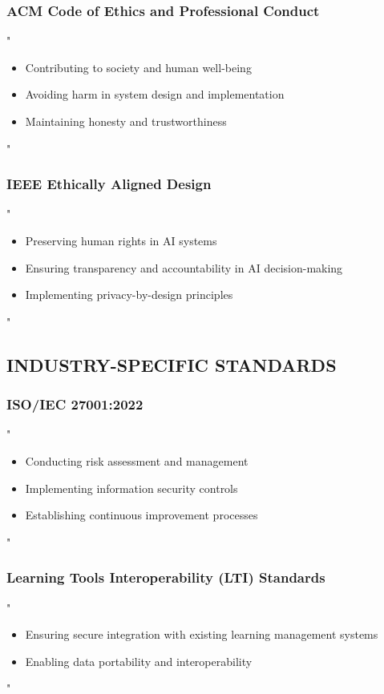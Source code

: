 \documentclass[14pt,a4paper]{article}
\begin{document}
\textit{\parencite[pp. 1-5]{BCS2024}}


\subsubsection*{ACM Code of Ethics and Professional Conduct}
"
\begin{itemize}
    \item Contributing to society and human well-being
    \item Avoiding harm in system design and implementation
    \item Maintaining honesty and trustworthiness
\end{itemize}
"

\textit{\parencite[pp. 1-4]{ACM2024}}

\subsubsection*{IEEE Ethically Aligned Design}
"
\begin{itemize}
    \item Preserving human rights in AI systems
    \item Ensuring transparency and accountability in AI decision-making
    \item Implementing privacy-by-design principles
\end{itemize}
"

\textit{\parencite[pp. 2-5]{IEEE2024}}


\subsection*{INDUSTRY-SPECIFIC STANDARDS}

\subsubsection*{ISO/IEC 27001:2022}
"
\begin{itemize}
    \item Conducting risk assessment and management
    \item Implementing information security controls
    \item Establishing continuous improvement processes
\end{itemize}
"

\textit{\parencite{ISO2022}}


\subsubsection*{Learning Tools Interoperability (LTI) Standards}
"
\begin{itemize}
    \item Ensuring secure integration with existing learning management systems
    \item Enabling data portability and interoperability
\end{itemize}
"
\end{document}
